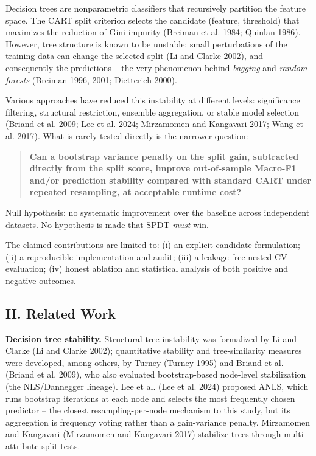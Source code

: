 \documentclass[
  conference]{IEEEtran}
\begin{document}
Decision trees are nonparametric classifiers that recursively partition
the feature space. The CART split criterion selects the candidate
(feature, threshold) that maximizes the reduction of Gini impurity
(Breiman et al. 1984; Quinlan 1986). However, tree structure is known to
be unstable: small perturbations of the training data can change the
selected split (Li and Clarke 2002), and consequently the predictions --
the very phenomenon behind \emph{bagging} and \emph{random forests}
(Breiman 1996, 2001; Dietterich 2000).

Various approaches have reduced this instability at different levels:
significance filtering, structural restriction, ensemble aggregation, or
stable model selection (Briand et al. 2009; Lee et al. 2024; Mirzamomen
and Kangavari 2017; Wang et al. 2017). What is rarely tested directly is
the narrower question:

\begin{quote}
\textbf{Can a bootstrap variance penalty on the split gain, subtracted
directly from the split score, improve out-of-sample Macro-F1 and/or
prediction stability compared with standard CART under repeated
resampling, at acceptable runtime cost?}
\end{quote}

Null hypothesis: no systematic improvement over the baseline across
independent datasets. No hypothesis is made that SPDT \emph{must} win.

The claimed contributions are limited to: (i) an explicit candidate
formulation; (ii) a reproducible implementation and audit; (iii) a
leakage-free nested-CV evaluation; (iv) honest ablation and statistical
analysis of both positive and negative outcomes.

\subsection{II. Related Work}\label{ii.-related-work}

\textbf{Decision tree stability.} Structural tree instability was
formalized by Li and Clarke (Li and Clarke 2002); quantitative stability
and tree-similarity measures were developed, among others, by Turney
(Turney 1995) and Briand et al. (Briand et al. 2009), who also evaluated
bootstrap-based node-level stabilization (the NLS/Dannegger lineage).
Lee et al. (Lee et al. 2024) proposed ANLS, which runs bootstrap
iterations at each node and selects the most frequently chosen predictor
-- the closest resampling-per-node mechanism to this study, but its
aggregation is frequency voting rather than a gain-variance penalty.
Mirzamomen and Kangavari (Mirzamomen and Kangavari 2017) stabilize trees
through multi-attribute split tests.
\end{document}
